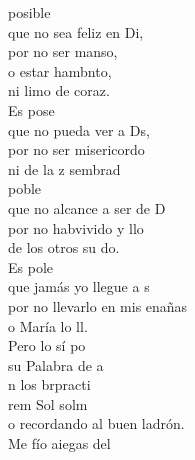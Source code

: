 \begin{cancion}%
	posible\\
	que no sea feliz en Di,\\
	\jump
por no ser manso, \\
	o estar hambnto,\\
	ni limo de coraz.\\
	\jump
	Es pose\\
	que no pueda ver a Ds,\\
	por no ser misericordo\\
	ni de la z sembrad\\
	\jump
	 poble\\
	que no alcance a ser de D\\
	por no habvivido y llo\\
	de los otros su do.\\
	\jump
	Es pole\\
	que jamás yo llegue a s\\
	por no llevarlo en mis enañas\\
	o María lo ll.\\
	Pero lo sí po \\
	su Palabra de a\\
	n los brpracti  \\
	   rem             Sol solm\\
o recordando al buen ladrón.\\
	Me fío aiegas del\\
	\jump
\end{cancion}%
